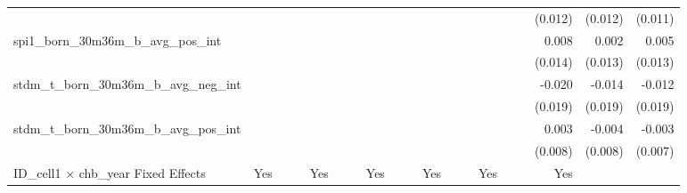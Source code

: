 \begin{tabular}{lrrrrrrrrrrrrrrrrrr}
                                            &              &              &              &              &              &              &              &              &               &              &              &               &              &              &               &      (0.012) &      (0.012) &       (0.011) \\ 
spi1\_born\_30m36m\_b\_avg\_pos\_int        &              &              &              &              &              &              &              &              &               &              &              &               &              &              &               &        0.008 &        0.002 &         0.005 \\ 
                                            &              &              &              &              &              &              &              &              &               &              &              &               &              &              &               &      (0.014) &      (0.013) &       (0.013) \\ 
stdm\_t\_born\_30m36m\_b\_avg\_neg\_int     &              &              &              &              &              &              &              &              &               &              &              &               &              &              &               &       -0.020 &       -0.014 &        -0.012 \\ 
                                            &              &              &              &              &              &              &              &              &               &              &              &               &              &              &               &      (0.019) &      (0.019) &       (0.019) \\ 
stdm\_t\_born\_30m36m\_b\_avg\_pos\_int     &              &              &              &              &              &              &              &              &               &              &              &               &              &              &               &        0.003 &       -0.004 &        -0.003 \\ 
                                            &              &              &              &              &              &              &              &              &               &              &              &               &              &              &               &      (0.008) &      (0.008) &       (0.007) \\ 
\midrule
ID\_cell1 $\times$ chb\_year Fixed Effects  &          Yes &              &              &          Yes &              &              &          Yes &              &               &          Yes &              &               &          Yes &              &               &          Yes &              &               \\ 

\end{tabular}
